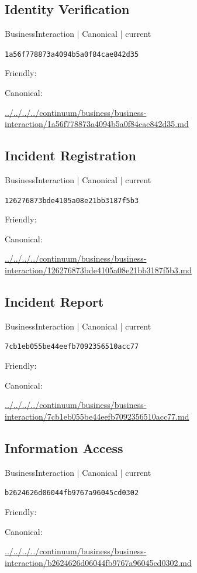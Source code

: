 \documentclass[10pt,a4paper]{article}
\begin{document}
\subsection*{Identity Verification}
{\small BusinessInteraction | Canonical | current}\par
\texttt{1a56f778873a4094b5a0f84cae842d35}\par
Friendly: \par
Canonical: \par
{\footnotesize\url{../../../../continuum/business/business-interaction/1a56f778873a4094b5a0f84cae842d35.md}}\par
\subsection*{Incident Registration}
{\small BusinessInteraction | Canonical | current}\par
\texttt{126276873bde4105a08e21bb3187f5b3}\par
Friendly: \par
Canonical: \par
{\footnotesize\url{../../../../continuum/business/business-interaction/126276873bde4105a08e21bb3187f5b3.md}}\par
\subsection*{Incident Report}
{\small BusinessInteraction | Canonical | current}\par
\texttt{7cb1eb055be44eefb7092356510acc77}\par
Friendly: \par
Canonical: \par
{\footnotesize\url{../../../../continuum/business/business-interaction/7cb1eb055be44eefb7092356510acc77.md}}\par
\subsection*{Information Access}
{\small BusinessInteraction | Canonical | current}\par
\texttt{b2624626d06044fb9767a96045cd0302}\par
Friendly: \par
Canonical: \par
{\footnotesize\url{../../../../continuum/business/business-interaction/b2624626d06044fb9767a96045cd0302.md}}\par
\end{document}
